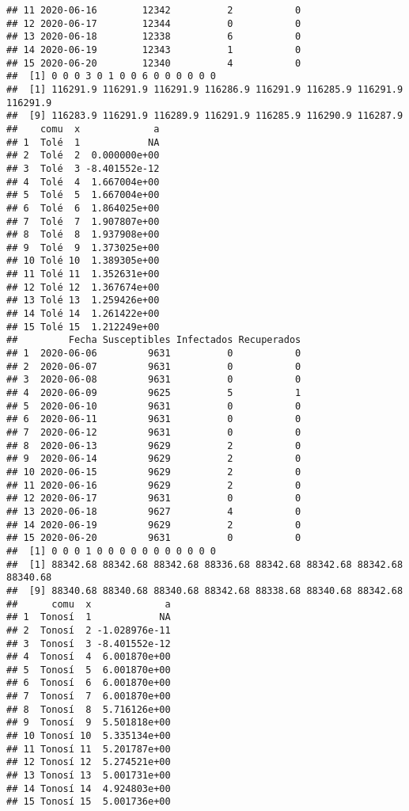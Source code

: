 \documentclass[
]{article}
\begin{document}
\begin{verbatim}
## 11 2020-06-16        12342          2           0
## 12 2020-06-17        12344          0           0
## 13 2020-06-18        12338          6           0
## 14 2020-06-19        12343          1           0
## 15 2020-06-20        12340          4           0
##  [1] 0 0 0 3 0 1 0 0 6 0 0 0 0 0 0
##  [1] 116291.9 116291.9 116291.9 116286.9 116291.9 116285.9 116291.9 116291.9
##  [9] 116283.9 116291.9 116289.9 116291.9 116285.9 116290.9 116287.9
##    comu  x             a
## 1  Tolé  1            NA
## 2  Tolé  2  0.000000e+00
## 3  Tolé  3 -8.401552e-12
## 4  Tolé  4  1.667004e+00
## 5  Tolé  5  1.667004e+00
## 6  Tolé  6  1.864025e+00
## 7  Tolé  7  1.907807e+00
## 8  Tolé  8  1.937908e+00
## 9  Tolé  9  1.373025e+00
## 10 Tolé 10  1.389305e+00
## 11 Tolé 11  1.352631e+00
## 12 Tolé 12  1.367674e+00
## 13 Tolé 13  1.259426e+00
## 14 Tolé 14  1.261422e+00
## 15 Tolé 15  1.212249e+00
##         Fecha Susceptibles Infectados Recuperados
## 1  2020-06-06         9631          0           0
## 2  2020-06-07         9631          0           0
## 3  2020-06-08         9631          0           0
## 4  2020-06-09         9625          5           1
## 5  2020-06-10         9631          0           0
## 6  2020-06-11         9631          0           0
## 7  2020-06-12         9631          0           0
## 8  2020-06-13         9629          2           0
## 9  2020-06-14         9629          2           0
## 10 2020-06-15         9629          2           0
## 11 2020-06-16         9629          2           0
## 12 2020-06-17         9631          0           0
## 13 2020-06-18         9627          4           0
## 14 2020-06-19         9629          2           0
## 15 2020-06-20         9631          0           0
##  [1] 0 0 0 1 0 0 0 0 0 0 0 0 0 0 0
##  [1] 88342.68 88342.68 88342.68 88336.68 88342.68 88342.68 88342.68 88340.68
##  [9] 88340.68 88340.68 88340.68 88342.68 88338.68 88340.68 88342.68
##      comu  x             a
## 1  Tonosí  1            NA
## 2  Tonosí  2 -1.028976e-11
## 3  Tonosí  3 -8.401552e-12
## 4  Tonosí  4  6.001870e+00
## 5  Tonosí  5  6.001870e+00
## 6  Tonosí  6  6.001870e+00
## 7  Tonosí  7  6.001870e+00
## 8  Tonosí  8  5.716126e+00
## 9  Tonosí  9  5.501818e+00
## 10 Tonosí 10  5.335134e+00
## 11 Tonosí 11  5.201787e+00
## 12 Tonosí 12  5.274521e+00
## 13 Tonosí 13  5.001731e+00
## 14 Tonosí 14  4.924803e+00
## 15 Tonosí 15  5.001736e+00
\end{verbatim}
\end{document}
